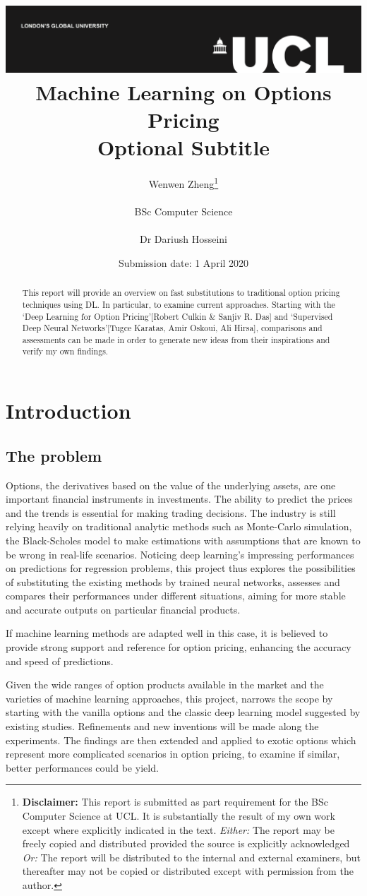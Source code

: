 \documentclass{report}
\title{{\vspace{-14em} \includegraphics[scale=0.4]{ucl_logo.png}}\\
{{\Huge Machine Learning on Options Pricing}}\\
{\large Optional Subtitle}\\
}
\date{Submission date: 1 April 2020}
\author{Wenwen Zheng\thanks{
{\bf Disclaimer:}
This report is submitted as part requirement for the BSc Computer Science at UCL. It is
substantially the result of my own work except where explicitly indicated in the text.
\emph{Either:} The report may be freely copied and distributed provided the source is explicitly acknowledged
\newline  
\emph{Or:}\newline
The report will be distributed to the internal and external examiners, but thereafter may not be copied or distributed except with permission from the author.}
\\ \\
BSc Computer Science\\ \\
Dr Dariush Hosseini }
\begin{document}
 
\onehalfspacing
\maketitle
\begin{abstract}
This report will provide an overview on fast substitutions to traditional option pricing techniques using DL. In particular, to examine current approaches. Starting with the ‘Deep Learning for Option Pricing’[Robert Culkin & Sanjiv R. Das] and ‘Supervised Deep Neural Networks’[Tugce Karatas, Amir Oskoui, Ali Hirsa], comparisons and assessments can be made in order to generate new ideas from their inspirations and verify my own findings. 

\end{abstract}
\tableofcontents
\setcounter{page}{1}


\chapter{Introduction}

\section{The problem}
Options, the derivatives based on the value of the underlying assets, are one important financial instruments in investments. The ability to predict the prices and the trends is essential for making trading decisions. The industry is still relying heavily on traditional analytic methods such as Monte-Carlo simulation, the Black-Scholes model to make estimations with assumptions that are known to be wrong in real-life scenarios. Noticing deep learning's impressing performances on predictions for regression problems, this project thus explores the possibilities of substituting the existing methods by trained neural networks, assesses and compares their performances under different situations, aiming for more stable and accurate outputs on particular financial products.

If machine learning methods are adapted well in this case, it is believed to provide strong support and reference for option pricing, enhancing the accuracy and speed of predictions.

Given the wide ranges of option products available in the market and the varieties of machine learning approaches, this project, narrows the scope by starting with the vanilla options and the classic deep learning model suggested by existing studies. Refinements and new inventions will be made along the experiments. The findings are then extended and applied to exotic options which represent more complicated scenarios in option pricing,  to examine if similar, better performances could be yield. 
\end{document}

